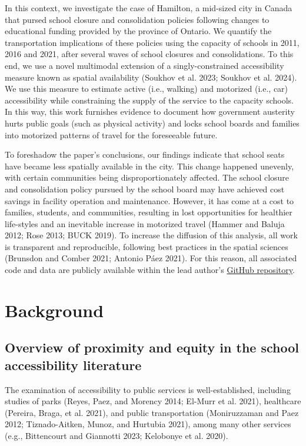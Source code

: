 \documentclass[
default
]{sn-jnl}
\begin{document}
In this context, we investigate the case of Hamilton, a mid-sized city
in Canada that pursed school closure and consolidation policies
following changes to educational funding provided by the province of
Ontario. We quantify the transportation implications of these policies
using the capacity of schools in 2011, 2016 and 2021, after several
waves of school closures and consolidations. To this end, we use a novel
multimodal extension of a singly-constrained accessibility measure known
as spatial availability (Soukhov et al. 2023; Soukhov et al. 2024). We
use this measure to estimate active (i.e., walking) and motorized (i.e.,
car) accessibility while constraining the supply of the service to the
capacity schools. In this way, this work furnishes evidence to document
how government austerity hurts public goals (such as physical activity)
and locks school boards and families into motorized patterns of travel
for the foreseeable future.

To foreshadow the paper's conclusions, our findings indicate that school
seats have became less spatially available in the city. This change
happened unevenly, with certain communities being disproportionately
affected. The school closure and consolidation policy pursued by the
school board may have achieved cost savings in facility operation and
maintenance. However, it has come at a cost to families, students, and
communities, resulting in lost opportunities for healthier life-styles
and an inevitable increase in motorized travel (Hammer and Baluja 2012;
Rose 2013; BUCK 2019). To increase the diffusion of this analysis, all
work is transparent and reproducible, following best practices in the
spatial sciences (Brunsdon and Comber 2021; Antonio Páez 2021). For this
reason, all associated code and data are publicly available within the
lead author's
\href{https://github.com/soukhova/School-closures-accessibility-impacts}{GitHub
repository}.

\section{Background}\label{background}

\subsection{Overview of proximity and equity in the school accessibility
literature}\label{overview-of-proximity-and-equity-in-the-school-accessibility-literature}

The examination of accessibility to public services is well-established,
including studies of parks (Reyes, Paez, and Morency 2014; El-Murr et
al. 2021), healthcare (Pereira, Braga, et al. 2021), and public
transportation (Moniruzzaman and Paez 2012; Tiznado-Aitken, Munoz, and
Hurtubia 2021), among many other services (e.g., Bittencourt and
Giannotti 2023; Kelobonye et al. 2020).
\end{document}
